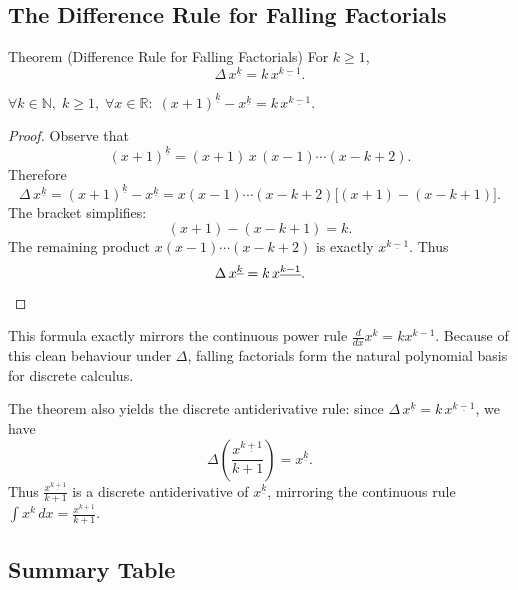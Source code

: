 \subsection*{The Difference Rule for Falling Factorials}

\begin{theorembox}{Theorem (Difference Rule for Falling Factorials)}
For \(k \ge 1\),
\[
\Delta\, x^{\underline{k}} = k\,x^{\underline{k-1}}.
\]
\end{theorembox}
\label{thm:falling-factorial-rule}

\begin{remark*}
\(\forall k \in \mathbb{N},\; k \ge 1,\; \forall x \in \mathbb{R}:\;
(x+1)^{\underline{k}} - x^{\underline{k}} = k\,x^{\underline{k-1}}\).
\end{remark*}

\begin{proof}
Observe that
\[
(x+1)^{\underline{k}} = (x+1)\,x\,(x-1)\cdots(x-k+2).
\]
Therefore
\[
\Delta\, x^{\underline{k}}
= (x+1)^{\underline{k}} - x^{\underline{k}}
= x(x-1)\cdots(x-k+2)\bigl[(x+1)-(x-k+1)\bigr].
\]
The bracket simplifies:
\[
(x+1)-(x-k+1) = k.
\]
The remaining product \(x(x-1)\cdots(x-k+2)\) is exactly
\(x^{\underline{k-1}}\). Thus
\[
\Delta\, x^{\underline{k}} = k\,x^{\underline{k-1}}. \qedhere
\]
\end{proof}

\begin{remark*}
This formula exactly mirrors the continuous power rule
\(\tfrac{d}{dx}x^k = kx^{k-1}\). Because of this clean behaviour under
\(\Delta\), falling factorials form the natural polynomial basis for
discrete calculus.
\end{remark*}

\begin{remark*}
The theorem also yields the discrete antiderivative rule: since
\(\Delta\,x^{\underline{k}} = k\,x^{\underline{k-1}}\), we have
\[
\Delta\!\left(\frac{x^{\underline{k+1}}}{k+1}\right) = x^{\underline{k}}.
\]
Thus \(\tfrac{x^{\underline{k+1}}}{k+1}\) is a discrete antiderivative
of \(x^{\underline{k}}\), mirroring the continuous rule
\(\int x^k\,dx = \tfrac{x^{k+1}}{k+1}\).
\end{remark*}

\subsection*{Summary Table}

